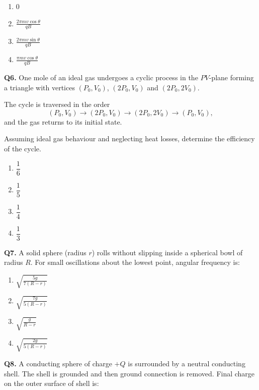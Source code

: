 \documentclass[12pt]{article}
\begin{document}
\begin{enumerate}[label=(\Alph*)]
\item $0$
\item $\displaystyle \frac{2\pi m v\cos\theta}{qB}$
\item $\displaystyle \frac{2\pi m v\sin\theta}{qB}$
\item $\displaystyle \frac{\pi m v\cos\theta}{qB}$
\end{enumerate}

\textbf{Q6.}  
One mole of an ideal gas undergoes a cyclic process in the $PV$-plane forming a triangle with vertices  
$(P_0,V_0)$, $(2P_0,V_0)$ and $(2P_0,2V_0)$.  

The cycle is traversed in the order  
\[
(P_0,V_0) \rightarrow (2P_0,V_0) \rightarrow (2P_0,2V_0) \rightarrow (P_0,V_0),
\]
and the gas returns to its initial state.  

Assuming ideal gas behaviour and neglecting heat losses, determine the efficiency of the cycle.

\begin{enumerate}[label=(\Alph*)]
\item $\dfrac{1}{6}$
\item $\dfrac{1}{5}$
\item $\dfrac{1}{4}$
\item $\dfrac{1}{3}$
\end{enumerate}
\textbf{Q7.}  
A solid sphere (radius $r$) rolls without slipping inside a spherical bowl of radius $R$.  
For small oscillations about the lowest point, angular frequency is:

\begin{enumerate}[label=(\Alph*)]
\item $\displaystyle \sqrt{\frac{5g}{7(R-r)}}$
\item $\displaystyle \sqrt{\frac{7g}{5(R-r)}}$
\item $\displaystyle \sqrt{\frac{g}{R-r}}$
\item $\displaystyle \sqrt{\frac{2g}{5(R-r)}}$
\end{enumerate}

\textbf{Q8.}  
A conducting sphere of charge $+Q$ is surrounded by a neutral conducting shell.  
The shell is grounded and then ground connection is removed.  
Final charge on the outer surface of shell is:
\end{document}
